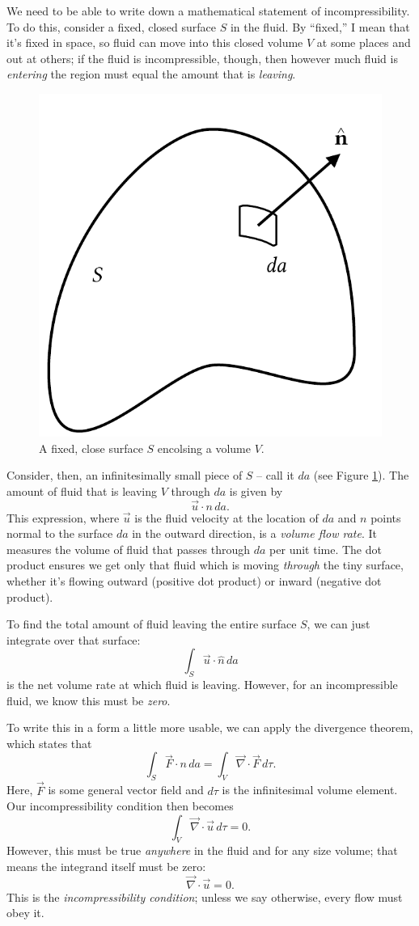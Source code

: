 We need to be able to write down a mathematical statement of incompressibility.  To do this, consider a fixed, closed surface $S$ in the fluid.  By ``fixed,'' I mean that it's fixed in space, so fluid can move into this closed volume $V$ at some places and out at others; if the fluid is incompressible, though, then however much fluid is \emph{entering} the region must equal the amount that is \emph{leaving}.  

\begin{figure}
\centering
\includegraphics[width=0.5\linewidth]{Figures/Chapter1/fig_closed_surface}
\caption{A fixed, close surface $S$ encolsing a volume $V$.}
\label{fig_closed_surface}
\end{figure}

Consider, then, an infinitesimally small piece of $S$ -- call it $da$ (see Figure \ref{fig_closed_surface}).  The amount of fluid that is leaving $V$ through $da$ is given by
\[
\vec{u} \cdot \unit{n} \, da.
\]
This expression, where $\vec{u}$ is the fluid velocity at the location of $da$ and $\unit{n}$ points normal to the surface $da$ in the outward direction, is a \emph{volume flow rate}.  It measures the volume of fluid that passes through $da$ per unit time.  The dot product ensures we get only that fluid which is moving \emph{through} the tiny surface, whether it's flowing outward (positive dot product) or inward (negative dot product).

To find the total amount of fluid leaving the entire surface $S$, we can just integrate over that surface:
\[
\int_S \vec{u} \cdot \hat{n} \, da
\]
is the net volume rate at which fluid is leaving.  However, for an incompressible fluid, we know this must be \emph{zero}.

To write this in a form a little more usable, we can apply the divergence theorem, which states that
\[
\int_S \vec{F} \cdot \unit{n} \, da = \int_V \vec{\nabla} \cdot \vec{F} \, d\tau.
\]
Here, $\vec{F}$ is some general vector field and $d\tau$ is the infinitesimal volume element.  Our incompressibility condition then becomes
\[
\int_V \vec{\nabla} \cdot \vec{u} \, d\tau = 0.
\]
However, this must be true \emph{anywhere} in the fluid and for any size volume; that means the integrand itself must be zero:
\begin{equation}
\label{eq_incompressibility}
\boxed{
\vec{\nabla} \cdot \vec{u} = 0.
}
\end{equation}
This is the \emph{incompressibility condition}; unless we say otherwise, every flow must obey it.

